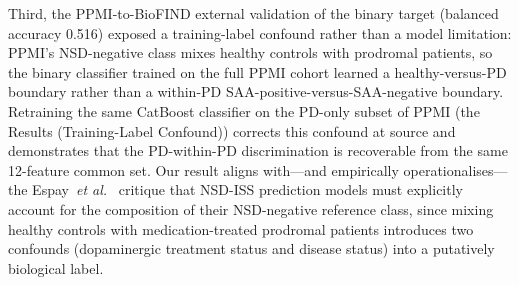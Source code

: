 \documentclass[10pt,letterpaper]{article}
\begin{document}
Third, the PPMI-to-BioFIND external validation of the binary target (balanced accuracy 0.516) exposed a training-label confound rather than a model limitation: PPMI's NSD-negative class mixes healthy controls with prodromal patients, so the binary classifier trained on the full PPMI cohort learned a healthy-versus-PD boundary rather than a within-PD SAA-positive-versus-SAA-negative boundary. Retraining the same CatBoost classifier on the PD-only subset of PPMI (the Results (Training-Label Confound)) corrects this confound at source and demonstrates that the PD-within-PD discrimination is recoverable from the same 12-feature common set. Our result aligns with---and empirically operationalises---the Espay~\textit{et al.}~\cite{espay2025med} critique that NSD-ISS prediction models must explicitly account for the composition of their NSD-negative reference class, since mixing healthy controls with medication-treated prodromal patients introduces two confounds (dopaminergic treatment status and disease status) into a putatively biological label.
\end{document}
